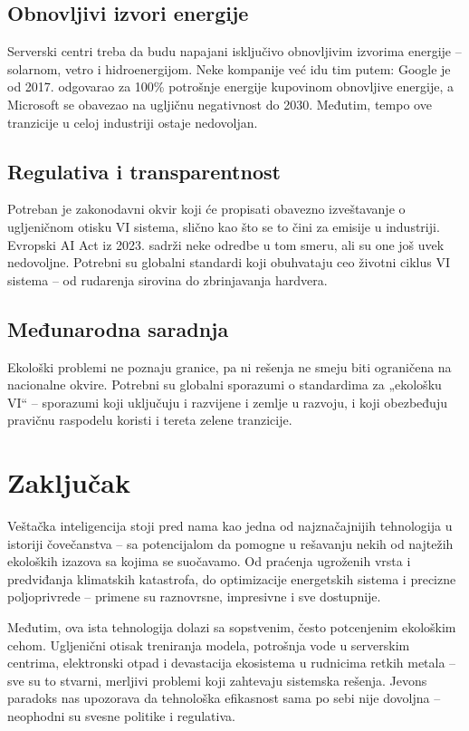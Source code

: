 \documentclass[12pt,a4paper]{article}
\begin{document}
\subsection{Obnovljivi izvori energije}
Serverski centri treba da budu napajani isključivo obnovljivim izvorima energije -- solarnom, vetro i hidroenergijom. Neke kompanije već idu tim putem: Google je od 2017. odgovarao za 100\% potrošnje energije kupovinom obnovljive energije, a Microsoft se obavezao na ugljičnu negativnost do 2030. Međutim, tempo ove tranzicije u celoj industriji ostaje nedovoljan.

\subsection{Regulativa i transparentnost}
Potreban je zakonodavni okvir koji će propisati obavezno izveštavanje o ugljeničnom otisku VI sistema, slično kao što se to čini za emisije u industriji. Evropski AI Act iz 2023. sadrži neke odredbe u tom smeru, ali su one još uvek nedovoljne. Potrebni su globalni standardi koji obuhvataju ceo životni ciklus VI sistema -- od rudarenja sirovina do zbrinjavanja hardvera.

\subsection{Međunarodna saradnja}
Ekološki problemi ne poznaju granice, pa ni rešenja ne smeju biti ograničena na nacionalne okvire. Potrebni su globalni sporazumi o standardima za „ekološku VI`` -- sporazumi koji uključuju i razvijene i zemlje u razvoju, i koji obezbeđuju pravičnu raspodelu koristi i tereta zelene tranzicije.

\section{Zaključak}
Veštačka inteligencija stoji pred nama kao jedna od najznačajnijih tehnologija u istoriji čovečanstva -- sa potencijalom da pomogne u rešavanju nekih od najtežih ekoloških izazova sa kojima se suočavamo. Od praćenja ugroženih vrsta i predviđanja klimatskih katastrofa, do optimizacije energetskih sistema i precizne poljoprivrede -- primene su raznovrsne, impresivne i sve dostupnije.

Međutim, ova ista tehnologija dolazi sa sopstvenim, često potcenjenim ekološkim cehom. Ugljenični otisak treniranja modela, potrošnja vode u serverskim centrima, elektronski otpad i devastacija ekosistema u rudnicima retkih metala -- sve su to stvarni, merljivi problemi koji zahtevaju sistemska rešenja. Jevons paradoks nas upozorava da tehnološka efikasnost sama po sebi nije dovoljna -- neophodni su svesne politike i regulativa.
\end{document}
